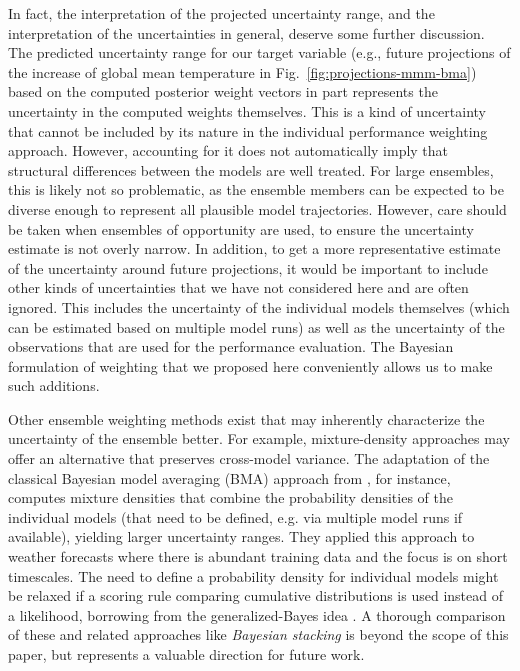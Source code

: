 In fact, the interpretation of the projected uncertainty range, and the interpretation of the uncertainties in general, deserve some further discussion. The predicted uncertainty range for our target variable (e.g., future projections of the increase of global mean temperature in Fig.~\ref{fig:projections-mmm-bma}) based on the computed posterior weight vectors in part represents the uncertainty in the computed weights themselves. This is a kind of uncertainty that cannot be included by its nature in the individual performance weighting approach. However, accounting for it does not automatically imply that structural differences between the models are well treated. For large ensembles, this is likely not so problematic, as the ensemble members can be expected to be diverse enough to represent all plausible model trajectories. However, care should be taken when ensembles of opportunity are used, to ensure the uncertainty estimate is not overly narrow.
In addition, to get a more representative estimate of the uncertainty around future projections, it would be important to include other kinds of uncertainties that we have not considered here and are often ignored. This includes the uncertainty of the individual models themselves (which can be estimated based on multiple model runs) as well as the uncertainty of the observations that are used for the performance evaluation. The Bayesian formulation of weighting that we proposed here conveniently allows us to make such additions.

Other ensemble weighting methods exist that may inherently characterize the uncertainty of the ensemble better. For example, mixture-density approaches may offer an alternative that preserves cross-model variance. The adaptation of the classical Bayesian model averaging (BMA) approach from \citet{rafteryUsingBayesianModel2005}, for instance, computes mixture densities that combine the probability densities of the individual models (that need to be defined, e.g. via multiple model runs if available), yielding larger uncertainty ranges. They applied this approach to weather forecasts where there is abundant training data and the focus is on short timescales. The need to define a probability density for individual models might be relaxed if a scoring rule comparing cumulative distributions \citep[e.g.][]{gneitingStrictlyProperScoring2007} is used instead of a likelihood, borrowing from the generalized-Bayes idea \citep{bissiriGeneralFrameworkUpdating2016}. A thorough comparison of these and related approaches like \emph{Bayesian stacking} \citep[see][]{yaoUsingStackingAverage2018} is beyond the scope of this paper, but represents a valuable direction for future work.

